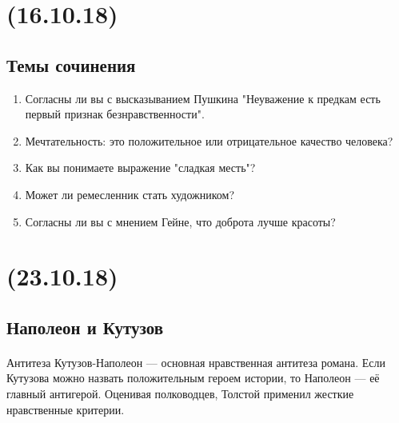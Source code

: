 \documentclass{article}
\begin{document}
\newpage
\noindent\makebox[\linewidth]{\rule{\paperwidth}{0.4pt}}
\section{(16.10.18)}
\noindent\makebox[\linewidth]{\rule{\paperwidth}{0.4pt}}

\subsection{Темы сочинения}

\begin{enumerate}
\item
  Согласны ли вы с высказыванием Пушкина "Неуважение к предкам есть первый признак безнравственности".
\item
  Мечтательность: это положительное или отрицательное качество человека?
\item
  Как вы понимаете выражение "сладкая месть"?
\item
  Может ли ремесленник стать художником?
\item
  Согласны ли вы с мнением Гейне, что доброта лучше красоты?
\end{enumerate}

\newpage
\noindent\makebox[\linewidth]{\rule{\paperwidth}{0.4pt}}
\section{(23.10.18)}
\noindent\makebox[\linewidth]{\rule{\paperwidth}{0.4pt}}

\subsection{Наполеон и Кутузов}

\paragraph{}
Антитеза Кутузов-Наполеон --- основная нравственная антитеза романа. Если Кутузова можно назвать положительным героем
истории, то Наполеон --- её главный антигерой.
Оценивая полководцев, Толстой применил жесткие нравственные критерии.
\end{document}
